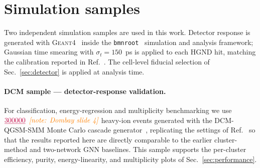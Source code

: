 \documentclass[aps,prc,twocolumn,superscriptaddress,showpacs,%
               nofootinbib,floatfix,longbibliography]{revtex4-2}
\newcommand{\NOTE}[1]{{\color{orange}\textit{[note: #1]}}}
\newcommand{\NUM}[3]{{\color{purple}\underline{#1}~#2}\,\NOTE{#3}}
\newcommand{\HGND}{HGND}
\newcommand{\GEANT}{\textsc{Geant4}}
\begin{document}
\section{Simulation samples}
\label{sec:simulation}

Two independent simulation samples are used in this work.  Detector
response is generated with \GEANT{}~\cite{Geant4} inside the
\texttt{bmnroot}~\cite{bmnroot} simulation and analysis framework;
Gaussian time smearing with $\sigma_t = 150$~ps is applied to each
\HGND{} hit, matching the calibration reported in
Ref.~\cite{Morozov2024HGND}.  The cell-level fiducial selection of
Sec.~\ref{sec:detector} is applied at analysis time.

\paragraph*{DCM sample --- detector-response validation.}
For classification, energy-regression and multiplicity benchmarking we
use $\NUM{300000}{}{Dombay slide 4}$ heavy-ion events generated with
the DCM-QGSM-SMM Monte Carlo cascade
generator~\cite{Baznat2020DCMSMM}, replicating the settings of
Ref.~\cite{Morozov2024HGND} so that the results reported here are
directly comparable to the earlier cluster-method and two-network GNN
baselines.  This sample supports the per-cluster efficiency, purity,
energy-linearity, and multiplicity plots of
Sec.~\ref{sec:performance}.
\end{document}
